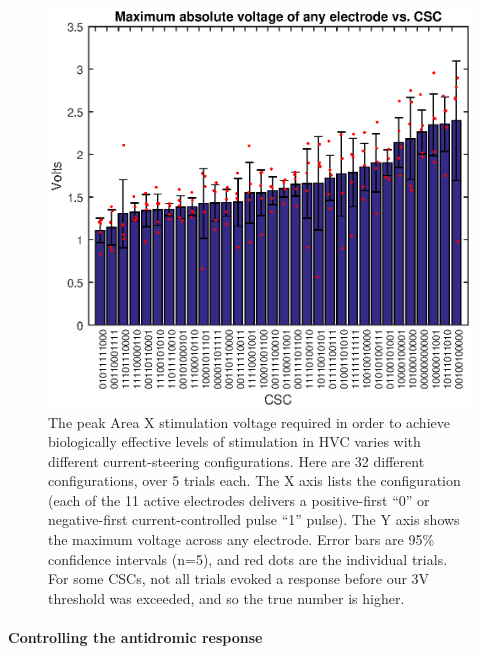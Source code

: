 \documentclass[10pt,letterpaper]{article}
\renewcommand{\subsubsection}[1]{\paragraph{#1}}
\begin{document}
\begin{figure}
  \includegraphics[width=\textwidth]{VoltageVsCSC}
  \caption{The peak Area X stimulation voltage required in order to achieve biologically effective levels of stimulation in HVC varies with different current-steering configurations.  Here are 32 different configurations, over 5 trials each.  The X axis lists the configuration (each of the 11 active electrodes delivers a positive-first ``0'' or negative-first current-controlled pulse ``1'' pulse).  The Y axis shows the maximum voltage across any electrode.  Error bars are 95\% confidence intervals (n=5), and red dots are the individual trials.  For some CSCs, not all trials evoked a response before our 3V threshold was exceeded, and so the true number is higher.}
  \label{fig:VoltageVsCSC}
\end{figure}

\subsubsection{Controlling the antidromic response}
\end{document}
